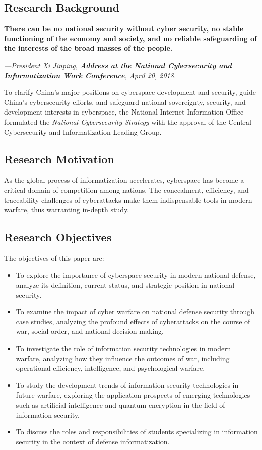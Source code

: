 \documentclass[12pt, a4paper]{article}
\begin{document}
\subsection{Research Background}

\textbf{There can be no national security without cyber security, no stable functioning of the economy and society, and no reliable safeguarding of the interests of the broad masses of the people.}  

\textit{—President Xi Jinping, \textbf{Address at the National Cybersecurity and Informatization Work Conference}, April 20, 2018.}\citep{ref0}

To clarify China's major positions on cyberspace development and security, guide China's cybersecurity efforts, and safeguard national sovereignty, security, and development interests in cyberspace, the National Internet Information Office formulated the \textit{National Cybersecurity Strategy} with the approval of the Central Cybersecurity and Informatization Leading Group. \citep{ref1}\citep{ref2}\cite{ref3}\cite{ref4}\cite{ref5}\cite{ref6}\cite{ref7}\cite{ref8}

\subsection{Research Motivation}
As the global process of informatization accelerates, cyberspace has become a critical domain of competition among nations. The concealment, efficiency, and traceability challenges of cyberattacks make them indispensable tools in modern warfare, thus warranting in-depth study.

\subsection{Research Objectives}
The objectives of this paper are:
\begin{itemize}
    \item To explore the importance of cyberspace security in modern national defense, analyze its definition, current status, and strategic position in national security.
    \item To examine the impact of cyber warfare on national defense security through case studies, analyzing the profound effects of cyberattacks on the course of war, social order, and national decision-making.
    \item To investigate the role of information security technologies in modern warfare, analyzing how they influence the outcomes of war, including operational efficiency, intelligence, and psychological warfare.
    \item To study the development trends of information security technologies in future warfare, exploring the application prospects of emerging technologies such as artificial intelligence and quantum encryption in the field of information security.
    \item To discuss the roles and responsibilities of students specializing in information security in the context of defense informatization.
\end{itemize}
\end{document}
